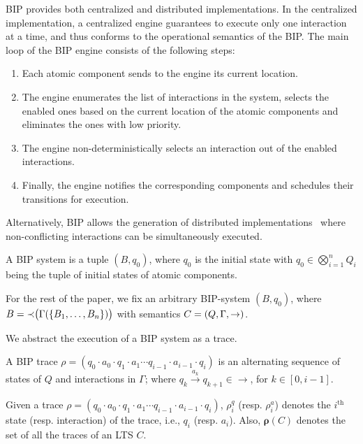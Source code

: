 BIP provides both centralized and distributed implementations. In the centralized implementation,
a centralized engine guarantees to execute only one interaction at a time, and thus conforms to the operational semantics of the BIP.  The main loop of the BIP engine consists of the following steps:
\begin{enumerate}
\item Each atomic component sends to the engine its current
location.
\item The engine enumerates the list of interactions in the system,
selects the enabled ones based on the current location
of the atomic components and eliminates the ones
with low priority.
\item The engine non-deterministically selects an interaction
out of the enabled interactions.
\item Finally, the engine notifies the corresponding components
and schedules their transitions for execution.
\end{enumerate}

Alternatively, BIP allows the generation of distributed
implementations~\cite{bip-distributed} where non-conflicting interactions
can be simultaneously executed.

\begin{definition}
\label{def:bipsystem}
A BIP system is a tuple $(B, q_0)$, where $q_0$ is the initial state with $q_0 \in \bigotimes_{i=1}^n Q_i$ being the tuple of initial states of atomic components.
\end{definition}


For the rest of the paper, we fix an arbitrary BIP-system $(B, q_0)$, where  $B = \mathit{\prec}\big(\Gamma(\{B_1, \ldots, B_n\})\big)$ with semantics $C = (Q, \Gamma, \stackrel{}{\rightarrow})$.

We abstract the execution of a BIP system as a trace.
%
\begin{definition}
\label{def:trace-global}
A BIP trace $\rho = (q_0 \cdot a_0 \cdot q_1 \cdot a_1 \cdots q_{i-1} \cdot a_{i-1} \cdot q_i)$ is an alternating sequence of states of $Q$ and interactions in $\Gamma$; where $q_k \xrightarrow{a_k} q_{k+1} \in \rightarrow$, for $k \in [0, i-1]$.
\end{definition}

Given a trace $\rho = (q_0 \cdot a_0 \cdot q_1 \cdot a_1 \cdots q_{i-1} \cdot a_{i-1} \cdot q_i)$, 
$\rho^q_i$ (resp. $\rho^a_i$) denotes the $i^\text{th}$ state (resp. interaction) of the trace, i.e., $q_i$ (resp. $a_i$). Also, $\bm{\rho}(C)$ denotes the set of all the traces of an LTS $C$. 






